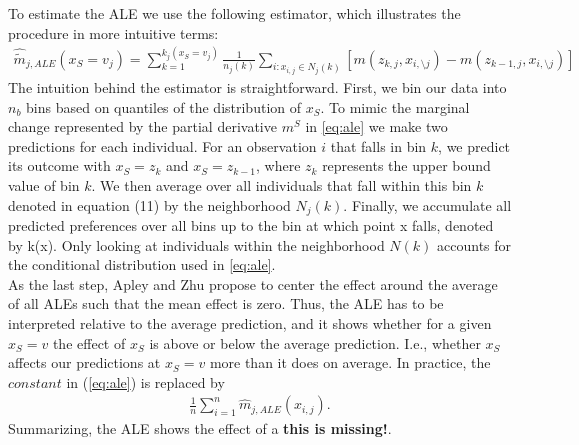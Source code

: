 To estimate the ALE we use the following estimator, which illustrates the procedure in more intuitive terms: 
\begin{align}
\hat{\tilde{m}}_{j, ALE}(x_S=v_j)=\sum_{k=1}^{k_j(x_S=v_j)} \frac{1}{n_j(k)}\sum_{i:x_{i,j}\in N_j(k)}[m(z_{k,j}, x_{i,\setminus j})-m(z_{k-1,j}, x_{i,\setminus j})] \label{eq:ale_estim}
\end{align}
The intuition behind the estimator is straightforward. First, we bin our data into $n_b$ bins based on quantiles of the distribution of $x_S$. To mimic the marginal change represented by the partial derivative $m^S$ in \ref{eq:ale} we make two predictions for each individual. For an observation $i$ that falls in bin $k$, we predict its outcome with $x_S=z_k$ and $x_S=z_{k-1}$, where $z_k$ represents the upper bound value of bin $k$. We then average over all individuals that fall within this bin $k$ denoted in equation (11) by the neighborhood $N_j(k)$. Finally, we accumulate all predicted preferences over all bins up to the bin at which point x falls, denoted by k(x). Only looking at individuals within the neighborhood $N(k)$ accounts for the conditional distribution used in \ref{eq:ale}. \\
As the last step, Apley and Zhu propose to center the effect around the average of all ALEs such that the mean effect is zero. Thus, the ALE has to be interpreted relative to the average prediction, and it shows whether for a given $x_S=v$ the effect of $x_S$ is above or below the average prediction. I.e., whether $x_S$ affects our predictions at $x_S=v$ more than it does on average. In practice, the $constant$ in (\ref{eq:ale}) is replaced by 
\begin{align*}
    \frac{1}{n}\sum_{i=1}^n \hat{m}_{j, ALE}(x_{i, j}).
\end{align*}
Summarizing, the ALE shows the effect of a \textbf{this is missing!}. \\

